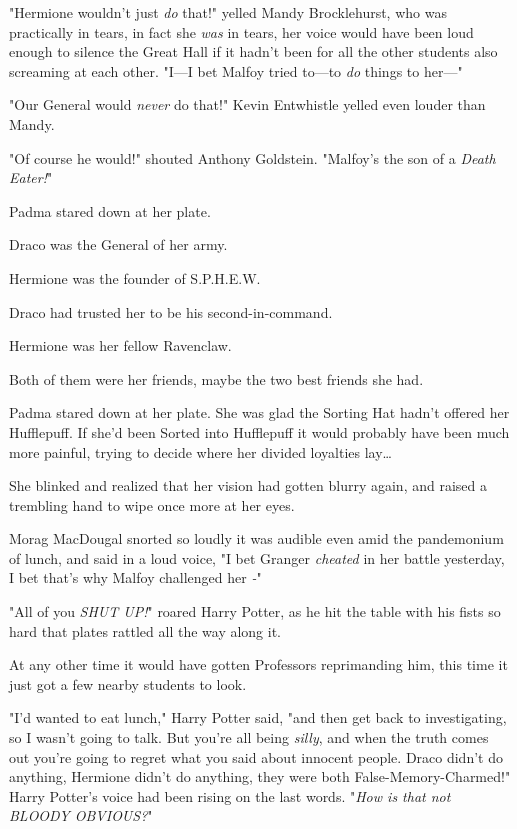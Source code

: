 "Hermione wouldn't just \emph{do} that!" yelled Mandy Brocklehurst, who was 
practically in tears, in fact she \emph{was} in tears, her voice would have 
been loud enough to silence the Great Hall if it hadn't been for all the other 
students also screaming at each other. "I---I bet Malfoy tried to---to 
\emph{do} things to her---"

"Our General would \emph{never} do that!" Kevin Entwhistle yelled even louder 
than Mandy.

"Of course he would!" shouted Anthony Goldstein. "Malfoy's the son of a 
\emph{Death Eater!}"

Padma stared down at her plate.

Draco was the General of her army.

Hermione was the founder of S.P.H.E.W.

Draco had trusted her to be his second-in-command.

Hermione was her fellow Ravenclaw.

Both of them were her friends, maybe the two best friends she had.

Padma stared down at her plate. She was glad the Sorting Hat hadn't offered her 
Hufflepuff. If she'd been Sorted into Hufflepuff it would probably have been 
much more painful, trying to decide where her divided loyalties lay{\ldots}

She blinked and realized that her vision had gotten blurry again, and raised a 
trembling hand to wipe once more at her eyes.

Morag MacDougal snorted so loudly it was audible even amid the pandemonium of 
lunch, and said in a loud voice, "I bet Granger \emph{cheated} in her battle 
yesterday, I bet that's why Malfoy challenged her \emph{-}"

"All of you \emph{SHUT UP!}" roared Harry Potter, as he hit the table with his 
fists so hard that plates rattled all the way along it.

At any other time it would have gotten Professors reprimanding him, this time 
it just got a few nearby students to look.

"I'd wanted to eat lunch," Harry Potter said, "and then get back to 
investigating, so I wasn't going to talk. But you're all being \emph{silly}, 
and when the truth comes out you're going to regret what you said about 
innocent people. Draco didn't do anything, Hermione didn't do anything, they 
were both False-Memory-Charmed!" Harry Potter's voice had been rising on the 
last words. "\emph{How is that not BLOODY OBVIOUS?}"

